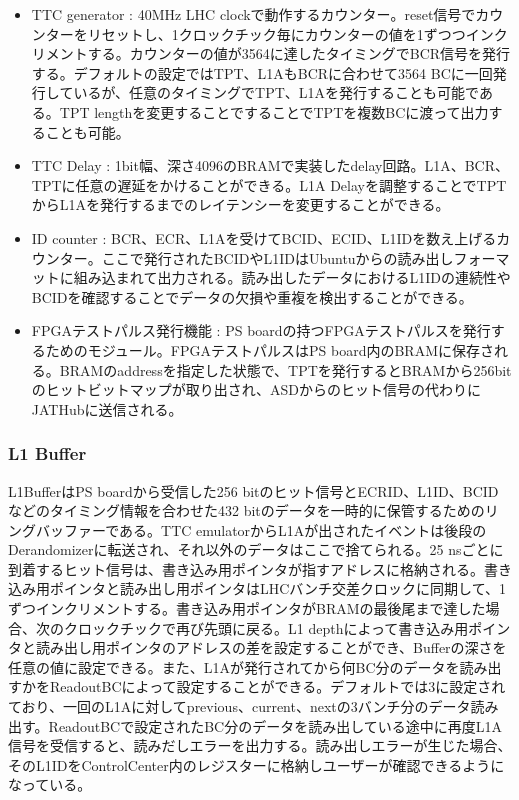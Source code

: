 \begin{itemize}
    \item {TTC generator : } 40MHz LHC clockで動作するカウンター。reset信号でカウンターをリセットし、1クロックチック毎にカウンターの値を1ずつつインクリメントする。カウンターの値が3564に達したタイミングでBCR信号を発行する。デフォルトの設定ではTPT、L1AもBCRに合わせて3564 BCに一回発行しているが、任意のタイミングでTPT、L1Aを発行することも可能である。TPT lengthを変更することですることでTPTを複数BCに渡って出力することも可能。
    \baselineskip

    \item{TTC Delay : }1bit幅、深さ4096のBRAMで実装したdelay回路。L1A、BCR、TPTに任意の遅延をかけることができる。L1A Delayを調整することでTPTからL1Aを発行するまでのレイテンシーを変更することができる。
    \baselineskip

    \item{ID counter : }BCR、ECR、L1Aを受けてBCID、ECID、L1IDを数え上げるカウンター。ここで発行されたBCIDやL1IDはUbuntuからの読み出しフォーマットに組み込まれて出力される。読み出したデータにおけるL1IDの連続性やBCIDを確認することでデータの欠損や重複を検出することができる。
    \baselineskip
    
    \item{FPGAテストパルス発行機能 : }PS boardの持つFPGAテストパルスを発行するためのモジュール。FPGAテストパルスはPS board内のBRAMに保存される。BRAMのaddressを指定した状態で、TPTを発行するとBRAMから256bitのヒットビットマップが取り出され、ASDからのヒット信号の代わりにJATHubに送信される。
    \baselineskip
\end{itemize}

\subsubsection{L1 Buffer} \par
L1BufferはPS boardから受信した256 bitのヒット信号とECRID、L1ID、BCIDなどのタイミング情報を合わせた432 bitのデータを一時的に保管するためのリングバッファーである。TTC emulatorからL1Aが出されたイベントは後段のDerandomizerに転送され、それ以外のデータはここで捨てられる。25 nsごとに到着するヒット信号は、書き込み用ポインタが指すアドレスに格納される。書き込み用ポインタと読み出し用ポインタはLHCバンチ交差クロックに同期して、1ずつインクリメントする。書き込み用ポインタがBRAMの最後尾まで達した場合、次のクロックチックで再び先頭に戻る。L1 depthによって書き込み用ポインタと読み出し用ポインタのアドレスの差を設定することができ、Bufferの深さを任意の値に設定できる。また、L1Aが発行されてから何BC分のデータを読み出すかをReadoutBCによって設定することができる。デフォルトでは3に設定されており、一回のL1Aに対してprevious、current、nextの3バンチ分のデータ読み出す。ReadoutBCで設定されたBC分のデータを読み出している途中に再度L1A信号を受信すると、読みだしエラーを出力する。読み出しエラーが生じた場合、そのL1IDをControlCenter内のレジスターに格納しユーザーが確認できるようになっている。
\baselineskip

